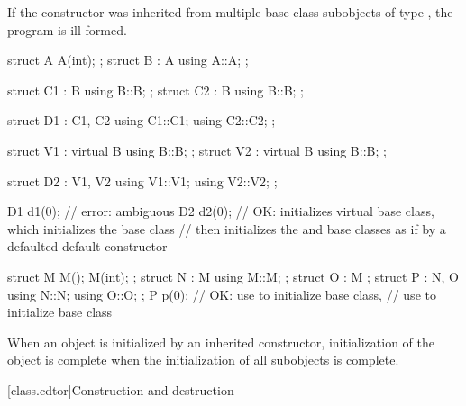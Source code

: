 \pnum
If the constructor was inherited from multiple base class subobjects
of type , the program is ill-formed.
\begin{example}
\begin{codeblock}
struct A { A(int); };
struct B : A { using A::A; };

struct C1 : B { using B::B; };
struct C2 : B { using B::B; };

struct D1 : C1, C2 {
  using C1::C1;
  using C2::C2;
};

struct V1 : virtual B { using B::B; };
struct V2 : virtual B { using B::B; };

struct D2 : V1, V2 {
  using V1::V1;
  using V2::V2;
};

D1 d1(0);           // error: ambiguous
D2 d2(0);           // OK: initializes virtual  base class, which initializes the  base class
                    // then initializes the  and  base classes as if by a defaulted default constructor

struct M { M(); M(int); };
struct N : M { using M::M; };
struct O : M {};
struct P : N, O { using N::N; using O::O; };
P p(0);             // OK: use  to initialize  base class,
                    // use  to initialize  base class
\end{codeblock}
\end{example}

\pnum
When an object is initialized by an inherited constructor,
initialization of the object is complete
when the initialization of all subobjects is complete.%

[class.cdtor]{Construction and destruction}%
%
%

